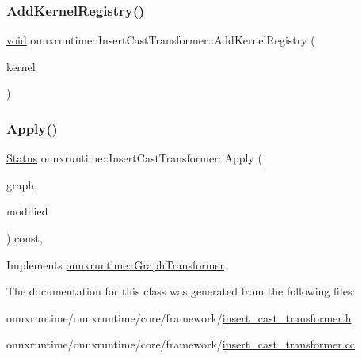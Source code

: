 \subsubsection{\texorpdfstring{Add\+Kernel\+Registry()}{AddKernelRegistry()}}
{\footnotesize\ttfamily \mbox{\hyperlink{mlasi_8h_a88f941d423cb2a819b70a1358982b1a6}{void}} onnxruntime\+::\+Insert\+Cast\+Transformer\+::\+Add\+Kernel\+Registry (\begin{DoxyParamCaption}\item[{const \mbox{\hyperlink{classonnxruntime_1_1KernelRegistry}{Kernel\+Registry}} \&}]{kernel }\end{DoxyParamCaption})\hspace{0.3cm}{\ttfamily [inline]}}

\mbox{\label{classonnxruntime_1_1InsertCastTransformer_a059a832a759981af5fdeed0780e65904}} 
\subsubsection{\texorpdfstring{Apply()}{Apply()}}
{\footnotesize\ttfamily \mbox{\hyperlink{classonnxruntime_1_1common_1_1Status}{Status}} onnxruntime\+::\+Insert\+Cast\+Transformer\+::\+Apply (\begin{DoxyParamCaption}\item[{\mbox{\hyperlink{classonnxruntime_1_1Graph}{onnxruntime\+::\+Graph}} \&}]{graph,  }\item[{bool \&}]{modified }\end{DoxyParamCaption}) const\hspace{0.3cm}{\ttfamily [override]}, {\ttfamily [virtual]}}



Implements \mbox{\hyperlink{classonnxruntime_1_1GraphTransformer_a690d351da797884409b1d7aa584e33b5}{onnxruntime\+::\+Graph\+Transformer}}.



The documentation for this class was generated from the following files\+:\begin{DoxyCompactItemize}
\item 
onnxruntime/onnxruntime/core/framework/\mbox{\hyperlink{insert__cast__transformer_8h}{insert\+\_\+cast\+\_\+transformer.\+h}}\item 
onnxruntime/onnxruntime/core/framework/\mbox{\hyperlink{insert__cast__transformer_8cc}{insert\+\_\+cast\+\_\+transformer.\+cc}}\end{DoxyCompactItemize}
